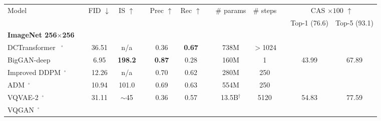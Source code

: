 
\begin{table}[h]
\small
    \centering
    {\small
    \begin{tabular}{lc ccc ccc ccc cc}
    \toprule
     {Model} & 
    
     & {FID}  $\downarrow$ & {IS}  $\uparrow$ & 
     &  {Prec}  $\uparrow$ & {Rec}   $\uparrow$ &
     
     &{\# params} & {\# steps} &
     
     & \multicolumn{2}{c}{{CAS $\times 100$} $\uparrow$}  
     \\
     \cline{12-13}
    &&  && & &&& & && {Top-1 (76.6)} & {Top-5 (93.1)} \\[-7pt]
    \textbf{ImageNet 256$\times$256} && &&& &&& &&& &
    \\[-2pt]
    \midrule
    
    DCTransformer~\cite{nash2021generating} $^\square$ &
    & 36.51 & n/a &
    & 0.36 & \textbf{0.67} &
    & 738M & $>$1024 &   & &
     \\ 
    
    BigGAN-deep~\cite{biggan}  & %
    & 6.95 & \bfseries{198.2} &
    & \textbf{0.87} & 0.28 &
    & 160M & 1 & & 43.99 &67.89
    \\
    
    Improved DDPM~\cite{nichol2021improved}$^\square$  &
    & 12.26 & n/a  &
    & 0.70 & 0.62 &
     & 280M & 250  &  &  & \\
    
    ADM~\cite{dhariwal2021diffusion}$^\square$   & 
    & 10.94 & 101.0  &
    & 0.69 & 0.63 &
    & 554M & 250 &  &  & \\
    

    
    VQVAE-2~\cite{Razavi19vqvae2}$^\square$ &
    & 31.11 & $\sim$45 &
    & 0.36 & 0.57 &
    & 13.5B$^\dagger$ & 5120 & & 54.83 & 77.59 \\
    \midrule
    VQGAN~\cite{Esser21vqgan}$^\square$ &
    

\end{tabular}}
\end{table}
